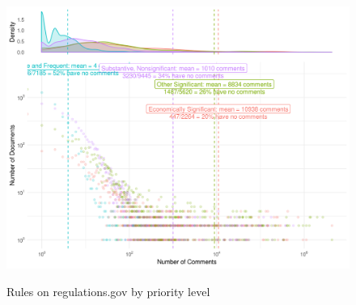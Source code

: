 \documentclass{article}
\begin{document}
\begin{figure}[p!]
    \centering
        \caption{Rules on regulations.gov by priority level}
    \includegraphics[width = 7in]{Figs/priority-comment-density-1.png}
    \label{fig:rules-priority}
\end{figure}




\clearpage 
\end{document}
